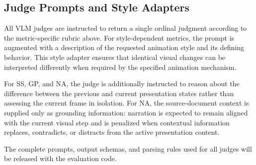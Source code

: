 \documentclass{article} %
\begin{document}
\subsection{Judge Prompts and Style Adapters}
\label{sec:supp_judge_prompts}

All VLM judges are instructed to return a single ordinal judgment according to
the metric-specific rubric above. For style-dependent metrics, the prompt is
augmented with a description of the requested animation style and its defining
behavior. This style adapter ensures that identical visual changes can be
interpreted differently when required by the specified animation mechanism.

For SS, GP, and NA, the judge is additionally instructed to reason about the
difference between the previous and current presentation states rather than
assessing the current frame in isolation. For NA, the source-document context
is supplied only as grounding information: narration is expected to remain
aligned with the current visual step and is penalized when contextual
information replaces, contradicts, or distracts from the active presentation
content.

The complete prompts, output schemas, and parsing rules used for all judges
will be released with the evaluation code.
\end{document}
